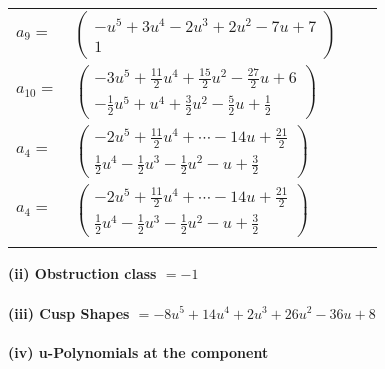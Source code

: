\documentclass[1p]{elsarticle_modified}
\theoremstyle{definition}
\begin{document}
\begin{tabular}{m{7pt} m{180pt} m{7pt} m{180pt} }
\flushright $a_{9}=$&$\begin{pmatrix}- u^5+3 u^4-2 u^3+2 u^2-7 u+7\\1\end{pmatrix}$ \\
\flushright $a_{10}=$&$\begin{pmatrix}-3 u^5+\frac{11}{2} u^4+\frac{15}{2} u^2-\frac{27}{2} u+6\\-\frac{1}{2} u^5+u^4+\frac{3}{2} u^2-\frac{5}{2} u+\frac{1}{2}\end{pmatrix}$ \\
\flushright $a_{4}=$&$\begin{pmatrix}-2 u^5+\frac{11}{2} u^4+\cdots-14 u+\frac{21}{2}\\\frac{1}{2} u^4-\frac{1}{2} u^3-\frac{1}{2} u^2- u+\frac{3}{2}\end{pmatrix}$\\ \flushright $a_{4}=$&$\begin{pmatrix}-2 u^5+\frac{11}{2} u^4+\cdots-14 u+\frac{21}{2}\\\frac{1}{2} u^4-\frac{1}{2} u^3-\frac{1}{2} u^2- u+\frac{3}{2}\end{pmatrix}$\\&\end{tabular}
\flushleft \textbf{(ii) Obstruction class $= -1$}\\~\\
\flushleft \textbf{(iii) Cusp Shapes $= -8 u^5+14 u^4+2 u^3+26 u^2-36 u+8$}\\~\\
\newpage\renewcommand{\arraystretch}{1}
\flushleft \textbf{(iv) u-Polynomials at the component}\newline \\
\end{document}
